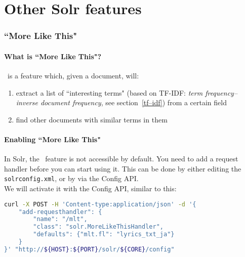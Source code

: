 

\renewcommand{\currentPart}{Other Solr features}
\part{\currentPart}   \label{part - Other Solr features}


\section{``More Like This"} \label{mlt}


\subsection{What is ``More Like This"?} \label{what-is-MLT}

\MLT\ is a feature which, given a document, will:
\begin{enumerate}
	\item extract a list of ``interesting terms" (based on TF-IDF: \emph{term frequency–inverse document frequency}, see section~\ref{tf–idf}) from a certain field	
	\item find other documents with similar terms in them
\end{enumerate}




\bigskip

\subsection{Enabling ``More Like This"} \label{enabling-mlt}

In Solr, the \MLT\ feature is not accessible by default. You need to add a request handler before you can start using it. This can be done by either editing the \texttt{solrconfig.xml}, or by via the Config API. \\

We will activate it with the Config API, similar to this:
\begin{lstlisting}[language=sh]
curl -X POST -H 'Content-type:application/json' -d '{   
	"add-requesthandler": {                            
		"name": "/mlt",
		"class": "solr.MoreLikeThisHandler",
		"defaults": {"mlt.fl": "lyrics_txt_ja"}
	}
}' "http://${HOST}:${PORT}/solr/${CORE}/config"
\end{lstlisting}

\bigskip



